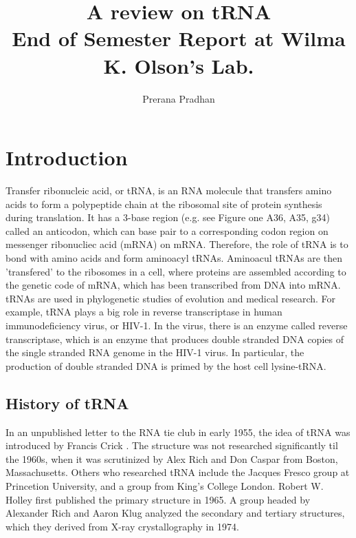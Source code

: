 \documentclass[pdftex, 12pt]{article}
\begin{document}
\author{Prerana Pradhan}
\title {A review on tRNA\\
\bigskip
\normalsize{End of Semester Report at Wilma K. Olson's Lab.}}
\maketitle
\section{Introduction} 
Transfer ribonucleic acid, or tRNA, is an RNA molecule that transfers amino acids to form a polypeptide chain at the ribosomal site of protein synthesis during translation. It has a 3-base region (e.g. see Figure one A36, A35, g34) called an anticodon, which can base pair to a corresponding codon region on messenger ribonucliec acid (mRNA) on mRNA. Therefore, the role of tRNA is to bond with amino acids and form aminoacyl tRNAs. Aminoacul tRNAs are then 'transfered' to the ribosomes in a cell, where proteins are assembled according to the genetic code of  mRNA, which has been transcribed from DNA into mRNA. tRNAs are used in phylogenetic studies of evolution and medical research. For example, tRNA plays a big role in reverse transcriptase in  human immunodeficiency virus, or HIV-1. In the virus, there is an enzyme called reverse transcriptase, which is an enzyme that produces double stranded DNA copies of the single stranded RNA genome in the HIV-1 virus. In particular, the production of double stranded DNA is primed by the host cell lysine-tRNA.  

\subsection{History of tRNA} 
In an unpublished letter to the RNA tie club in early 1955, the idea  of tRNA was introduced by Francis Crick \cite{crick1958}. The structure was not researched significantly til the 1960s, when it was scrutinized by Alex Rich and Don Caspar from Boston, Massachusetts. Others who researched tRNA include the Jacques Fresco group at Princetion University, and a group from King's  College London. Robert W. Holley first published the primary structure in 1965. A group headed by Alexander Rich and Aaron Klug analyzed the secondary and tertiary structures, which they derived from X-ray crystallography in 1974.
\end{document}
